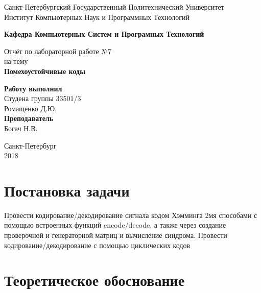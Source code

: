 \documentclass[10pt,a4paper,oneside]{article}
\begin{document}
\begin{titlepage}
	\newpage
	\begin{center}
		\Large Санкт-Петербургский Государственный Политехнический Университет\\
		Институт Компьютерных Наук и Программных Технологий\\
	\end{center}
	\begin{center}
		\large\textbf {Кафедра Компьютерных Систем и Програмных Технологий}
	\end{center}
	
	\vspace{10em}
	\begin{center}
		\large{Отчёт по лабораторной работе №7 \\ на тему \\
			\textbf{Помехоустойчивые коды} }
	\end{center}
	
	\vspace{20em}
	\begin{flushright}
		\textbf{Работу выполнил\\}Студена группы 33501/3 \\ Ромащенко Д.Ю.\\
		\textbf{Преподаватель\\}Богач Н.В. 
	\end{flushright}
	
	\vspace{\fill}%
	\begin{center}
		Санкт-Петербург \\ 2018
	\end{center}
\end{titlepage} %


\section{Постановка задачи}

\hspace{0,5cm} Провести кодирование/декодирование сигнала кодом Хэмминга 2мя способами с помощью встроенных функций encode/decode, а также через создание проверочной и генераторной матриц и вычисление синдрома. Провести кодирование/декодирование с помощью циклических кодов

\section{Теоретическое обоснование}
\end{document}
